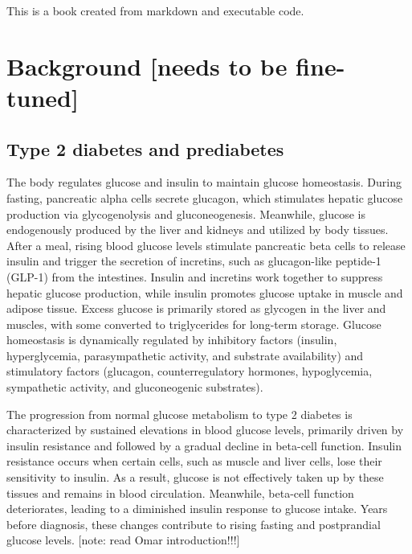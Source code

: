 \documentclass[
  a4paper,
  headsepline=true,
  open=any]{scrbook}
\begin{document}
This is a book created from markdown and executable code.


\hypertarget{background-needs-to-be-fine-tuned}{%
\chapter{Background {[}needs to be
fine-tuned{]}}\label{background-needs-to-be-fine-tuned}}

\hypertarget{type-2-diabetes-and-prediabetes}{%
\section{Type 2 diabetes and
prediabetes}\label{type-2-diabetes-and-prediabetes}}

The body regulates glucose and insulin to maintain glucose homeostasis.
During fasting, pancreatic alpha cells secrete glucagon, which
stimulates hepatic glucose production via glycogenolysis and
gluconeogenesis. Meanwhile, glucose is endogenously produced by the
liver and kidneys and utilized by body tissues. After a meal, rising
blood glucose levels stimulate pancreatic beta cells to release insulin
and trigger the secretion of incretins, such as glucagon-like peptide-1
(GLP-1) from the intestines. Insulin and incretins work together to
suppress hepatic glucose production, while insulin promotes glucose
uptake in muscle and adipose tissue. Excess glucose is primarily stored
as glycogen in the liver and muscles, with some converted to
triglycerides for long-term storage. Glucose homeostasis is dynamically
regulated by inhibitory factors (insulin, hyperglycemia, parasympathetic
activity, and substrate availability) and stimulatory factors (glucagon,
counterregulatory hormones, hypoglycemia, sympathetic activity, and
gluconeogenic substrates).

The progression from normal glucose metabolism to type 2 diabetes is
characterized by sustained elevations in blood glucose levels, primarily
driven by insulin resistance and followed by a gradual decline in
beta-cell function. Insulin resistance occurs when certain cells, such
as muscle and liver cells, lose their sensitivity to insulin. As a
result, glucose is not effectively taken up by these tissues and remains
in blood circulation. Meanwhile, beta-cell function deteriorates,
leading to a diminished insulin response to glucose intake. Years before
diagnosis, these changes contribute to rising fasting and postprandial
glucose levels. {[}note: read Omar introduction!!!{]}
\end{document}
